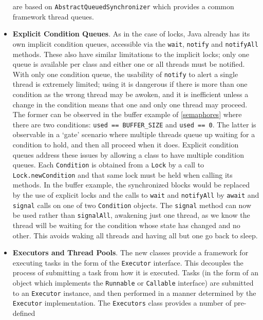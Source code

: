 \begin{itemize}
    are based on \texttt{AbstractQueuedSynchronizer}\cite{aqs} which
    provides a common framework thread queues.
    \item \textbf{Explicit Condition Queues}.  As in the case of
      locks, Java already has its own implicit condition queues,
      accessible via the \texttt{wait}, \texttt{notify} and
      \texttt{notifyAll} methods.  These also have similar limitations
      to the implicit locks; only one queue is available per class and
      either one or all threads must be notified.  With only one
      condition queue, the usability of \texttt{notify} to alert a
      single thread is extremely limited; using it is dangerous if
      there is more than one condition as the wrong thread may be
      awoken, and it is inefficient unless a change in the condition
      means that one and only one thread may proceed.  The former can
      be observed in the buffer example of \ref{semaphores} where
      there are two conditions: \texttt{used == BUFFER\_SIZE} and
      \texttt{used == 0}. The latter is observable in a `gate'
      scenario where multiple threads queue up waiting for a condition
      to hold, and then all proceed when it does.  Explicit condition
      queues address these issues by allowing a class to have multiple
      condition queues.  Each \texttt{Condition} is obtained from a
      \texttt{Lock} by a call to \texttt{Lock.newCondition} and that
      same lock must be held when calling its methods.  In the buffer
      example, the synchronized blocks would be replaced by the use of
      explicit locks and the calls to \texttt{wait} and
      \texttt{notifyAll} by \texttt{await} and \texttt{signal} calls
      on one of two \texttt{Condition} objects.  The \texttt{signal}
      method can now be used rather than \texttt{signalAll}, awakening
      just one thread, as we know the thread will be waiting for the
      condition whose state has changed and no other.  This avoids
      waking all threads and having all but one go back to sleep.
    \item \textbf{Executors and Thread Pools}.  The new classes
      provide a framework for executing tasks in the form of the
      \texttt{Executor} interface.  This decouples the process of
      submitting a task from how it is executed.  Tasks (in the form
      of an object which implements the \texttt{Runnable} or
      \texttt{Callable} interface) are submitted to an
      \texttt{Executor} instance, and then performed in a manner
      determined by the \texttt{Executor} implementation.  The
      \texttt{Executors} class provides a number of pre-defined

\end{itemize}
